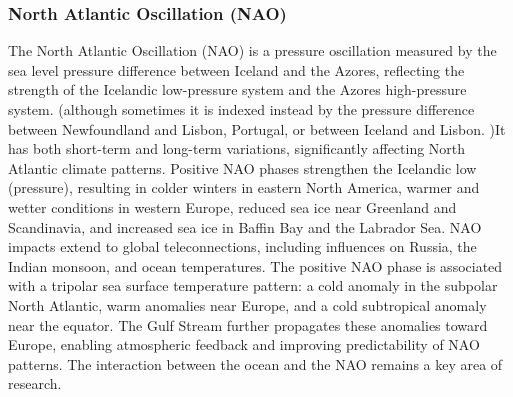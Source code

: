 \subsubsection{North Atlantic Oscillation (NAO)}
The North Atlantic Oscillation (NAO) is a pressure oscillation measured by the sea level pressure difference between Iceland and the Azores, reflecting the strength of the Icelandic low-pressure system and the Azores high-pressure system. (although sometimes it is indexed instead by the pressure difference between Newfoundland and Lisbon, Portugal, or between Iceland and Lisbon. )It has both short-term and long-term variations, significantly affecting North Atlantic climate patterns. Positive NAO phases strengthen the Icelandic low (pressure), resulting in colder winters in eastern North America, warmer and wetter conditions in western Europe, reduced sea ice near Greenland and Scandinavia, and increased sea ice in Baffin Bay and the Labrador Sea.
NAO impacts extend to global teleconnections, including influences on Russia, the Indian monsoon, and ocean temperatures. The positive NAO phase is associated with a tripolar sea surface temperature pattern: a cold anomaly in the subpolar North Atlantic, warm anomalies near Europe, and a cold subtropical anomaly near the equator. The Gulf Stream further propagates these anomalies toward Europe, enabling atmospheric feedback and improving predictability of NAO patterns. The interaction between the ocean and the NAO remains a key area of research.

